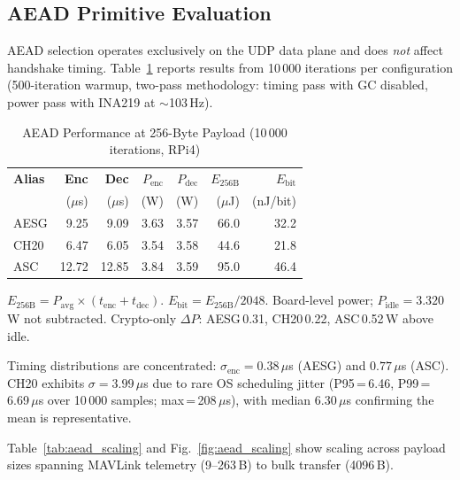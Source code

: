 \subsection{AEAD Primitive Evaluation}
\label{sec:aead}

AEAD selection operates exclusively on the UDP data plane and does
\emph{not} affect handshake timing.  Table~\ref{tab:aead} reports
results from 10\,000 iterations per configuration (500-iteration
warmup, two-pass methodology: timing pass with GC disabled, power
pass with INA219 at $\sim$103\,Hz).

\begin{table}[t]
\centering
\caption{AEAD Performance at 256-Byte Payload (10\,000 iterations, RPi4)}
\label{tab:aead}
\footnotesize
\begin{tabular}{@{}lrrrrrr@{}}
\toprule
\textbf{Alias} &
  \textbf{Enc} & \textbf{Dec} &
  \textbf{$P_\text{enc}$} & \textbf{$P_\text{dec}$} &
  \textbf{$E_\text{256B}$} & \textbf{$E_\text{bit}$} \\
& ($\mu$s) & ($\mu$s) & (W) & (W) & ($\mu$J) & (nJ/bit) \\
\midrule
AESG & 9.25  & 9.09  & 3.63 & 3.57 & 66.0  & 32.2 \\
CH20 & 6.47  & 6.05  & 3.54 & 3.58 & 44.6  & 21.8 \\
ASC  & 12.72 & 12.85 & 3.84 & 3.59 & 95.0  & 46.4 \\
\bottomrule
\end{tabular}
\begin{tablenotes}
\footnotesize
\item $E_\text{256B} = P_\text{avg} \times (t_\text{enc} + t_\text{dec})$.
  $E_\text{bit} = E_\text{256B} / 2048$.
  Board-level power; $P_\text{idle} = 3.320$\,W not subtracted.
  Crypto-only $\Delta P$: AESG\,0.31, CH20\,0.22, ASC\,0.52\,W above idle.
\end{tablenotes}
\end{table}

Timing distributions are concentrated: $\sigma_\text{enc} = 0.38$\,$\mu$s
(AESG) and $0.77$\,$\mu$s (ASC).  CH20 exhibits $\sigma =
3.99$\,$\mu$s due to rare OS scheduling jitter (P95\,=\,6.46,
P99\,=\,6.69\,$\mu$s over 10\,000 samples; max\,=\,208\,$\mu$s),
with median 6.30\,$\mu$s confirming the mean is representative.

Table~\ref{tab:aead_scaling} and Fig.~\ref{fig:aead_scaling} show
scaling across payload sizes spanning MAVLink telemetry (9--263\,B)
to bulk transfer (4096\,B).

